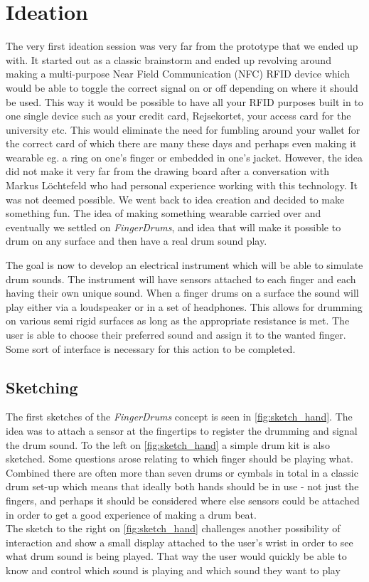 \chapter{Ideation}
\label{Ideation}
The very first ideation session was very far from the prototype that we ended up with. It started out as a classic brainstorm and ended up revolving around making a multi-purpose Near Field Communication (NFC) RFID device which would be able to toggle the correct signal on or off depending on where it should be used. This way it would be possible to have all your RFID purposes built in to one single device such as your credit card, Rejsekortet, your access card for the university etc. This would eliminate the need for fumbling around your wallet for the correct card of which there are many these days and perhaps even making it wearable eg. a ring on one's finger or embedded in one's jacket. However, the idea did not make it very far from the drawing board after a conversation with Markus Löchtefeld who had personal experience working with this technology. It was not deemed possible. We went back to idea creation and decided to make something fun. The idea of making something wearable carried over and eventually we settled on \textit{FingerDrums}, and idea that will make it possible to drum on any surface and then have a real drum sound play. 

The goal is now to develop an electrical instrument which will be able to simulate drum sounds. The instrument will have sensors attached to each finger and each having their own unique sound. When a finger drums on a surface the sound will play either via a loudspeaker or in a set of headphones. This allows for drumming on various semi rigid surfaces as long as the appropriate resistance is met. The user is able to choose their preferred sound and assign it to the wanted finger. Some sort of interface is necessary for this action to be completed.



\section{Sketching}
The first sketches of the \textit{FingerDrums} concept is seen in \autoref{fig:sketch_hand}. The idea was to attach a sensor at the fingertips to register the drumming and signal the drum sound. To the left on \autoref{fig:sketch_hand} a simple drum kit is also  sketched. Some questions arose relating to which finger should be playing what. Combined there are often more than seven drums or cymbals in total in a classic drum set-up which means that ideally both hands should be in use - not just the fingers, and perhaps it should be considered where else sensors could be attached in order to get a good experience of making a drum beat.\\
The sketch to the right on \autoref{fig:sketch_hand} challenges another possibility of interaction and show a small display attached to the user's wrist in order to see what drum sound is being played. That way the user would quickly be able to know and control which sound is playing and which sound they want to play

